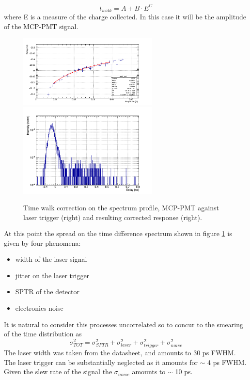 \begin{equation}
t_{walk} = A + B\cdot E^{C}
\end{equation}
where E is a measure of the charge collected. In this case it will be the amplitude of the MCP-PMT signal.
\begin{figure}[htbp]
\begin{center}
\includegraphics[width=7cm]{../Pictures/Chapter_8/time_walk_corr.png}
\includegraphics[width=7cm]{../Pictures/Chapter_8/laser.png}
\end{center}
\caption[MCP corrected response (laser trigger)]{Time walk correction on the spectrum profile, MCP-PMT against laser trigger (right) and resulting corrected response (right).}
\label{fig:mcp_laser_walk}
\end{figure}
At this point the spread on the time difference spectrum shown in figure \ref{fig:mcp_laser_walk} is given by four phenomena:
\begin{itemize}
\item width of the laser signal
\item jitter on the laser trigger
\item SPTR of the detector
\item electronics noise
\end{itemize}
It is natural to consider this processes uncorrelated so to concur to the smearing of the time distribution as
\begin{equation}
\sigma _{TOT}^{2} = \sigma _{SPTR}^{2} + \sigma _{laser}^{2} + \sigma _{trigger}^{2} + \sigma _{noise}^{2} 
\end{equation}
The laser width was taken from the datasheet, and amounts to 30 ps FWHM. The laser trigger can be substantially neglected as it amounts for $\sim$ 4 ps FWHM. Given the slew rate of the signal the $\sigma _{noise}$ amounts to $\sim$ 10 ps.

